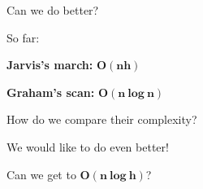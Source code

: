 \documentclass[14pt, handout]{beamer}
\begin{document}
\begin{frame}{Can we do better?}
	\begin{center}
		\begin{fullpageitemize}
			\item<1-> So far:
			\begin{baseitemize}
				\item<2->[\rtarrow] \textbf{Jarvis's march:} \textcolor{colorgreen}{$\bm{O(nh)}$}
				\item<3->[\rtarrow] \textbf{Graham's scan:} \textcolor{colorgreen}{$\bm{O(n\ log\ n)}$}
			\end{baseitemize}
		\vspace{5mm}		
		\item<4->[\rtarrow] How do we compare their complexity?\\
		\item<5->[\rtarrow] We would like to do even better!
		\end{fullpageitemize}
		Can we get to \textcolor{colorgreen}{$\bm{O(n\ log\ h)}$}?
	\end{center}
\end{frame}
\end{document}
